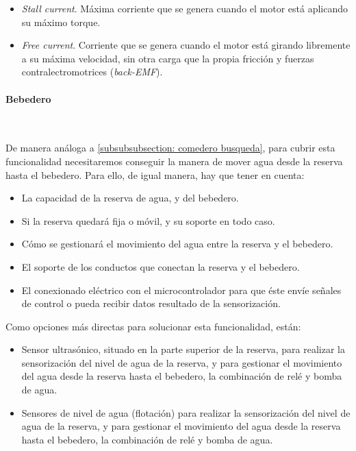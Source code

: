 \documentclass[12pt]{article}
\newcommand{\subsubsubsection}[1]{\paragraph{#1}\mbox{}\\}
\begin{document}
	\begin{itemize}
		\item \textit{Stall current}. Máxima corriente que se genera cuando el motor está aplicando su máximo torque.
		\item \textit{Free current}. Corriente que se genera cuando el motor está girando libremente a su máxima velocidad, sin otra carga que la propia fricción y fuerzas contralectromotrices (\textit{back-EMF}). 
	\end{itemize}

	\pagebreak
	
	\subsubsubsection{Bebedero}
	\label{subsubsubsection: bebedero busqueda soluciones}
	
	\noindent De manera análoga a \ref{subsubsubsection: comedero busqueda}, para cubrir esta funcionalidad necesitaremos conseguir la manera de mover agua desde la reserva hasta el bebedero. Para ello, de igual manera, hay que tener en cuenta: 
	
	\begin{itemize}
		\item La capacidad de la reserva de agua, y del bebedero.
		\item Si la reserva quedará fija o móvil, y su soporte en todo caso.
		\item Cómo se gestionará el movimiento del agua entre la reserva y el bebedero.
		\item El soporte de los conductos que conectan la reserva y el bebedero.
		\item El conexionado eléctrico con el microcontrolador para que éste envíe señales de control o pueda recibir datos resultado de la sensorización.
	\end{itemize}
	
	\noindent Como opciones más directas para solucionar esta funcionalidad, están: 
	
	\begin{itemize}
		\item Sensor ultrasónico, situado en la parte superior de la reserva, para realizar la sensorización del nivel de agua de la reserva, y para gestionar el movimiento del agua desde la reserva hasta el bebedero, la combinación de relé y bomba de agua. 
		\item Sensores de nivel de agua (flotación) para realizar la sensorización del nivel de agua de la reserva, y para gestionar el movimiento del agua desde la reserva hasta el bebedero, la combinación de relé y bomba de agua.
	\end{itemize}
	
\end{document}

